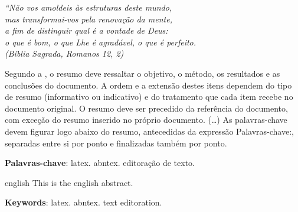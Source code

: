 \documentclass[
	12pt,				%
	openright,			%
	oneside,			%
	a4paper,			%
	english,			%
	french,				%
	spanish,			%
	brazil				%
	]{abntex2}
\begin{document}

\begin{epigrafe}
     \vspace*{\fill}
 	\begin{flushright}
 		\textit{``Não vos amoldeis às estruturas deste mundo, \\
 		mas transformai-vos pela renovação da mente, \\
 		a fim de distinguir qual é a vontade de Deus: \\
 		o que é bom, o que Lhe é agradável, o que é perfeito.\\
 		(Bíblia Sagrada, Romanos 12, 2)}
 	\end{flushright}
 \end{epigrafe}


\setlength{\absparsep}{18pt} %
\begin{resumo}
 Segundo a , o resumo deve ressaltar o
 objetivo, o método, os resultados e as conclusões do documento. A ordem e a extensão
 destes itens dependem do tipo de resumo (informativo ou indicativo) e do
 tratamento que cada item recebe no documento original. O resumo deve ser
 precedido da referência do documento, com exceção do resumo inserido no
 próprio documento. (\ldots) As palavras-chave devem figurar logo abaixo do
 resumo, antecedidas da expressão Palavras-chave:, separadas entre si por
 ponto e finalizadas também por ponto.

 \textbf{Palavras-chave}: latex. abntex. editoração de texto.
\end{resumo}

\begin{resumo}[Abstract]
  \begin{otherlanguage*}{english}
    This is the english abstract.
 
    \vspace{\onelineskip}
 
    \noindent 
    \textbf{Keywords}: latex. abntex. text editoration.
  \end{otherlanguage*}
\end{resumo}


\listoffigures*
\cleardoublepage
\end{document}
